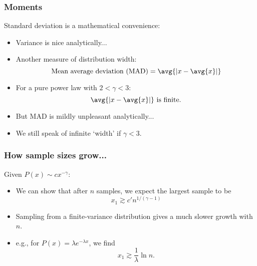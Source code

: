
\begin{frame}
  \frametitle{Moments}

  \begin{block}{Standard deviation is a mathematical convenience:}
    \begin{itemize}
    \item<2-> 
      Variance is nice analytically...
    \item<3-> 
      Another measure of distribution width:
      $$
      \mbox{Mean average deviation (MAD)} =
      \avg{\left| x - \avg{x} \right|}
      $$
    \item<4->
      For a pure power law with $2 < \gamma < 3$:
      $$\avg{\left| x - \avg{x} \right|} \ \mbox{is finite.}$$
    \item<5->
      But MAD is mildly unpleasant analytically...
    \item<6->
      We still speak of infinite `width' if $\gamma < 3$.
    \end{itemize}
  \end{block}


\end{frame}


\begin{frame}
  \frametitle{How sample sizes grow...}

  \begin{block}{Given $P(x) \sim c x^{-\gamma}$:}
    \begin{itemize}
    \item<1-> 
      We can show that after $n$ samples,
      we expect the largest sample to be 
      $$ x_{1} \gtrsim c' n^{1/(\gamma-1)} $$
    \item<2-> 
      Sampling from a 
      finite-variance distribution 
      gives a much slower growth with $n$.
    \item<3-> 
      e.g., for $P(x) = \lambda e^{-\lambda x}$,
      we find
      $$ x_{1} \gtrsim \frac{1}{\lambda} \ln n. $$
    \end{itemize}
  \end{block}


\end{frame}

